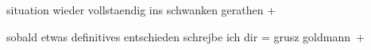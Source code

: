 \pstart
           situation wieder vollstaendig ins schwanken gerathen +\pend
           
\pstart
           sobald etwas definitives entschieden schrejbe ich dir =\pend
           \pstart grusz \spacefill\mbox{goldmann +}\pend{}\endnumbering{}  \newcommand{\dateiname}{L02679}\newcommand{\titel}{Paul Goldmann an Arthur Schnitzler, [31. 1. 1899?]}\newcommand{\editorInnen}{Martin Anton Müller und Laura Untner}
